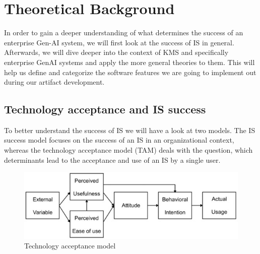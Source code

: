\documentclass[
	english,
	ruledheaders=section,%
	class=report,%
	thesis={type=bachelor},%
	accentcolor=1b,%
	custommargins=true,%
	marginpar=false,%
	parskip=half-,%
	fontsize=11pt,%
	DIV=14,
]{tudapub}
\begin{document}
\chapter{Theoretical Background}
In order to gain a deeper understanding of what determines the success of an enterprise Gen-AI system, we will first look at the success of IS in general. Afterwards, we will dive deeper into the context of KMS and specifically enterprise GenAI systems and apply the more general theories to them. This will help us define and categorize the software features we are going to implement out during our artifact development.
\section{Technology acceptance and IS success}
To better understand the success of IS we will have a look at two models. The IS success model \parencite{DeloneMcLean2003ISSuccessTenYearUpdate} focuses on the success of an IS in an organizational context, whereas the technology acceptance model (TAM) deals with the question, which determinants lead to the acceptance and use of an IS by a single user.
\begin{figure}[h!]
    \includegraphics[width=1\linewidth]{images/TAM.png}
    \caption{Technology acceptance model}
    \label{fig:enter-label}
\end{figure}
\\
\end{document}
